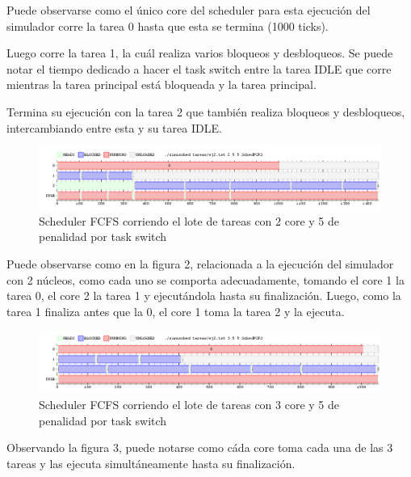 \documentclass[a4paper,10pt,twoside]{article}
\begin{document}
Puede observarse como el único core del scheduler para esta ejecución del simulador corre la tarea 0 hasta que esta se termina (1000 ticks).

Luego corre la tarea 1, la cuál realiza varios bloqueos y desbloqueos. Se puede notar el tiempo dedicado a hacer el task switch entre la tarea IDLE que corre mientras la tarea principal está bloqueada y la tarea principal.

Termina su ejecución con la tarea 2 que también realiza bloqueos y desbloqueos, intercambiando entre esta y su tarea IDLE.

\begin{figure}[ht!]
\centering
\includegraphics[width=180mm]{../ejercicio2/FCFS2Core.png}
\caption{Scheduler FCFS corriendo el lote de tareas con 2 core y 5 de penalidad por task switch}
\label{overflow}
\end{figure}

Puede observarse como en la figura 2, relacionada a la ejecución del simulador con 2 núcleos, como cada uno se comporta adecuadamente, tomando el core 1 la tarea 0, el core 2 la tarea 1 y ejecutándola hasta su finalización. Luego, como la tarea 1 finaliza antes que la 0, el core 1 toma la tarea 2 y la ejecuta.

\begin{figure}[ht!]
\centering
\includegraphics[width=180mm]{../ejercicio2/FCFS3Core.png}
\caption{Scheduler FCFS corriendo el lote de tareas con 3 core y 5 de penalidad por task switch}
\label{overflow}
\end{figure}

Observando la figura 3, puede notarse como cáda core toma cada una de las 3 tareas y las ejecuta simultáneamente hasta su finalización.

\end{document}
